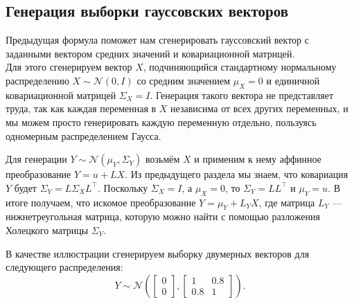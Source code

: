 \documentclass[11pt,a4paper]{article}
\begin{document}
    \hypertarget{ux433ux435ux43dux435ux440ux430ux446ux438ux44f-ux432ux44bux431ux43eux440ux43aux438-ux433ux430ux443ux441ux441ux43eux432ux441ux43aux438ux445-ux432ux435ux43aux442ux43eux440ux43eux432}{%
\subsection{Генерация выборки гауссовских
векторов}\label{ux433ux435ux43dux435ux440ux430ux446ux438ux44f-ux432ux44bux431ux43eux440ux43aux438-ux433ux430ux443ux441ux441ux43eux432ux441ux43aux438ux445-ux432ux435ux43aux442ux43eux440ux43eux432}}

Предыдущая формула поможет нам сгенерировать гауссовский вектор с
заданными вектором средних значений и ковариационной матрицей.\\
Для этого сгенерируем вектор \(X\), подчиняющийся стандартному
нормальному распределению \(X \sim \mathcal{N}(0, I)\) со средним
значением \(\mu_{X} = 0\) и единичной ковариационной матрицей
\(\Sigma_{X} = I\). Генерация такого вектора не представляет труда, так
как каждая переменная в \(X\) независима от всех других переменных, и мы
можем просто генерировать каждую переменную отдельно, пользуясь
одномерным распределением Гаусса.

Для генерации \(Y \sim \mathcal{N}(\mu_{Y}, \Sigma_{Y})\) возьмём \(X\)
и применим к нему аффинное преобразование \(Y = u + LX\). Из предыдущего
раздела мы знаем, что ковариация \(Y\) будет
\(\Sigma_{Y} = L\Sigma_{X}L^\top\). Поскольку \(\Sigma_{X}=I\), а
\(\mu_{X} = 0\), то \(\Sigma_{Y} = L L^\top\) и \(\mu_{Y} = u\). В итоге
получаем, что искомое преобразование \(Y = \mu_{Y} + L_{Y}X\), где
матрица \(L_{Y}\) --- нижнетреугольная матрица, которую можно найти с
помощью разложения Холецкого матрицы \(\Sigma_{Y}\).

    В качестве иллюстрации сгенерируем выборку двумерных векторов для
следующего распределения: \[
Y
\sim
\mathcal{N}\left(
\begin{bmatrix}
    0 \\
    0
\end{bmatrix},
\begin{bmatrix}
    1 & 0.8 \\
    0.8 & 1
\end{bmatrix}\right).
\]
\end{document}
